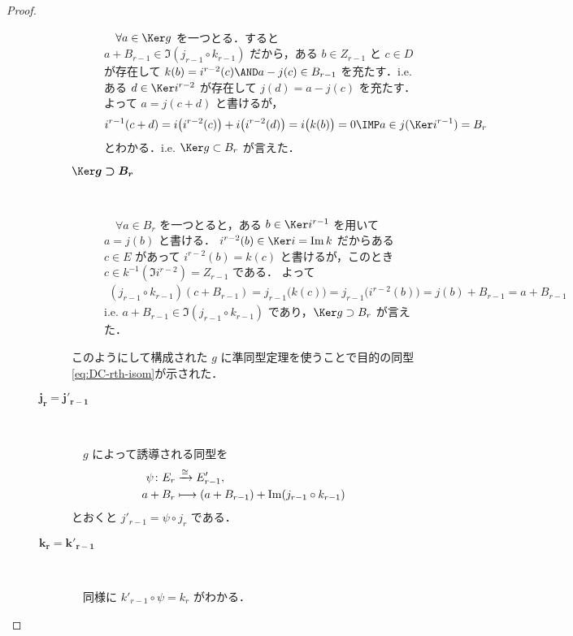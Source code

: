 \documentclass[algtopo_main]{subfiles}
\begin{document}
\begin{proof}
\begin{description}
\begin{description}
\begin{description}
                　$\forall a \in \Ker g$ を一つとる．すると $a + B_{r-1} \in \Im (j_{r-1} \circ k_{r-1})$ だから，ある $b \in Z_{r-1}$ と $c \in D$ が存在して $k(b) = i^{r-2}(c) \AND a - j(c) \in B_{r-1}$ を充たす．i.e. ある $d \in \Ker i^{r-2}$ が存在して $j(d) = a - j(c)$ を充たす．よって $a = j(c+d)$ と書けるが，
                \begin{align}
                    i^{r-1}(c+d) = i \bigl( i^{r-2}(c) \bigr) + i \bigl( i^{r-2}(d) \bigr) = i \bigl( k(b) \bigr) = 0 \IMP a \in j(\Ker i^{r-1}) = B_r
                \end{align}
                とわかる．i.e. $\Ker g \subset B_r$ が言えた．
                \item[\textbf{$\bm{\Ker g \supset B_r}$}]　
                
                　$\forall a \in B_r$ を一つとると，ある $b \in \Ker i^{r-1}$ を用いて $a = j(b)$ と書ける．
                $i^{r-2}(b) \in \Ker i = \Im k$ だからある $c \in E$ があって $i^{r-2}(b) = k(c)$ と書けるが，このとき $c \in k^{-1}(\Im i^{r-2}) = Z_{r-1}$ である．
                よって
                \begin{align}
                    (j_{r-1} \circ k_{r-1})(c + B_{r-1}) = j_{r-1} \bigl( k(c) \bigr) = j_{r-1} \bigl( i^{r-2}(b) \bigr) = j(b) + B_{r-1} = a + B_{r-1}
                \end{align}
                i.e. $a + B_{r-1} \in \Im(j_{r-1} \circ k_{r-1})$ であり，$\Ker g \supset B_r$ が言えた． 
            \end{description}
            このようにして構成された $g$ に準同型定理を使うことで目的の同型\eqref{eq:DC-rth-isom}が示された．

            \item[\textbf{$\bm{j_r = j'_{r-1}}$}] 　
            
            　$g$ によって誘導される同型を
            \begin{align}
                \psi \colon E_r &\xrightarrow{\cong} E'_{r-1},\\ 
                a + B_r &\longmapsto (a + B_{r-1}) + \Im (j_{r-1} \circ k_{r-1})
            \end{align}
            とおくと $j'_{r-1} = \psi \circ j_{r}$ である．
            \item[\textbf{$\bm{k_r = k'_{r-1}}$}] 　
            
            　同様に $k'_{r-1} \circ \psi = k_r$ がわかる．
        \end{description}

    \end{description}
    
\end{proof}
\end{document}
